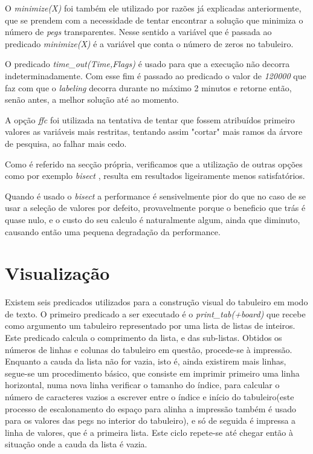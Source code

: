 \documentclass{llncs}
\begin{document}
O \emph{minimize(X)} foi tamb\'{e}m ele utilizado por raz\~{o}es j\'{a} explicadas anteriormente, que se prendem com a necessidade de tentar encontrar a solu\c{c}\~{a}o que minimiza o n\'{u}mero de \emph{pegs} transparentes. Nesse sentido a vari\'{a}vel que \'{e} passada ao predicado \emph{minimize(X)} \'{e} a vari\'{a}vel que conta o n\'{u}mero de zeros no tabuleiro. 

O predicado \emph{time\_out(Time,Flags)} \'{e} usado para que a execu\c{c}\~{a}o n\~{a}o decorra indeterminadamente. Com esse fim \'{e} passado ao predicado o valor de \emph{120000} que faz com que o \emph{labeling} decorra  durante no m\'{a}ximo 2 minutos e retorne ent\~{a}o, sen\~{a}o antes, a melhor solu\c{c}\~{a}o at\'{e} ao momento.

A op\c{c}\~{a}o \emph{ffc} foi utilizada na tentativa de tentar que fossem atribu\'{i}dos primeiro valores as vari\'{a}veis mais restritas, tentando assim "cortar" mais ramos da \'{a}rvore de pesquisa, ao falhar mais cedo.

Como \'{e} referido na sec\c{c}\~{a}o pr\'{o}pria, verificamos que a utiliza\c{c}\~{a}o de outras op\c{c}\~{o}es como por exemplo \emph{bisect} , resulta em resultados ligeiramente menos satisfat\'{o}rios.

Quando \'{e} usado o \emph{bisect} a performance \'{e} sensivelmente pior do que no caso de se usar a sele\c{c}\~{a}o de valores por defeito, provavelmente porque o beneficio que tr\'{a}s \'{e} quase nulo, e o custo do seu calculo \'{e} naturalmente algum, ainda que diminuto, causando ent\~{a}o uma pequena degrada\c{c}\~{a}o da performance.


\section{Visualiza\c{c}\~{a}o}

Existem seis predicados utilizados para a constru\c{c}\~{a}o visual do tabuleiro em modo de texto. O primeiro predicado a ser executado \'{e} o \textit{print\_tab(+board)} que recebe como argumento um tabuleiro representado por uma lista de listas de inteiros. Este predicado calcula o comprimento da lista, e das sub-listas. Obtidos os n\'{u}meros de linhas e colunas do tabuleiro em quest\~{a}o, procede-se \`{a} impress\~{a}o. Enquanto a cauda da lista n\~{a}o for vazia, isto \'{e}, ainda existirem mais linhas, segue-se um procedimento b\'{a}sico, que consiste em imprimir primeiro uma linha horizontal, numa nova linha verificar o tamanho do \'{i}ndice, para calcular o n\'{u}mero de caracteres vazios a escrever entre o \'{i}ndice e in\'{i}cio do tabuleiro(este processo de escalonamento do espa\c{c}o para alinha a impress\~{a}o tamb\'{e}m \'{e} usado para os valores das pegs no interior do tabuleiro), e s\'{o} de seguida \'{e} impressa a linha de valores, que \'{e} a primeira lista. Este ciclo repete-se at\'{e} chegar ent\~{a}o \`{a} situa\c{c}\~{a}o onde a cauda da lista \'{e} vazia. 
\end{document}
